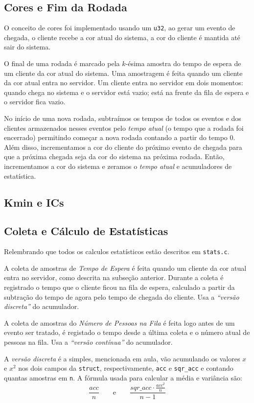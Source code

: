 \documentclass[a4paper]{article}
\newcommand{\arq}{\texttt}
\newcommand{\inlcode}{\texttt}
\begin{document}
\subsection{Cores e Fim da Rodada}
O conceito de cores foi implementado usando um \inlcode{u32},
ao gerar um evento de chegada,
o cliente recebe a cor atual do sistema,
a cor do cliente é mantida até sair do sistema.

O final de uma rodada é marcado pela \(k\)-ésima
amostra do tempo de espera de
um cliente da cor atual do sistema.
Uma amostragem é feita quando um cliente da cor atual
entra no servidor.
Um cliente entra no servidor em dois momentos:
quando chega no sistema e o servidor está vazio;
está na frente da fila de espera e o servidor fica vazio.

No início de uma nova rodada,
subtraímos os tempos de todos os eventos e
dos clientes armazenados nesses eventos
pelo \emph{tempo atual} (o tempo que a rodada foi encerrado)
permitindo começar a nova rodada contando a partir do tempo \(0\).
Além disso, incrementamos a cor do cliente
do próximo evento de chegada
para que a próxima chegada seja da cor do sistema na próxima rodada.
Então, incrementamos a cor do sistema e
zeramos o \emph{tempo atual} e
acumuladores de estatística.

\subsection{Kmin e ICs}

\subsection{Coleta e Cálculo de Estatísticas}
Relembrando que todos os calculos estatísticos estão
descritos em \arq{stats.c}.

A coleta de amostras de \emph{Tempo de Espera} é feita
quando um cliente da cor atual entra no servidor,
como descrita na subseção anterior.
Durante a coleta é registrado o tempo
que o cliente ficou na fila de espera,
calculado a partir da subtração do tempo de agora
pelo tempo de chegada do cliente.
Usa a \emph{``versão discreta''} do acumulador.

A coleta de amostras do \emph{Número de Pessoas na Fila} é feita
logo antes de um evento ser tratado,
é registado o tempo desde a última coleta e o número atual
de pessoas na fila.
Usa a \emph{``versão contínua''} do acumulador.

A \emph{versão discreta} é a simples, mencionada em aula,
vão acumulando os valores \(x\) e \(x^2\) nos dois campos
da \inlcode{struct}, respectivamente, \inlcode{acc} e
\inlcode{sqr\_acc} e contando quantas amostras em \inlcode{n}.
A fórmula usada para calcular a média e variância são:
\[
    \frac{acc}{n}
    \qquad\text{e}\qquad
    \frac{sqr\_acc \cdot \frac{acc^2}{n}}{n - 1}
\]
\end{document}

